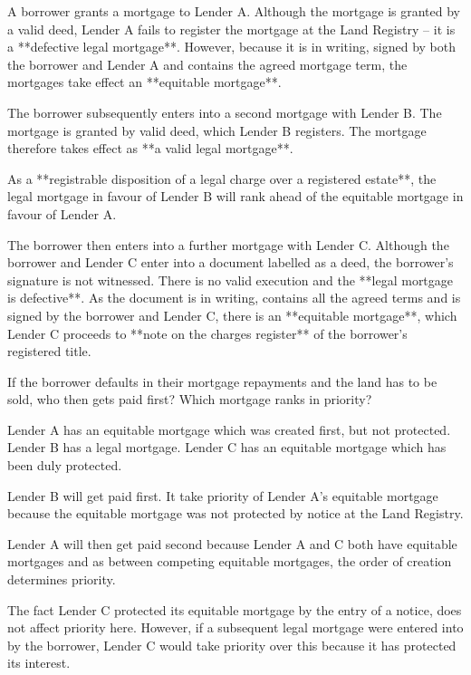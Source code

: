 \documentclass[
]{article}
\newenvironment{Shaded}{}{}
\newcommand{\NormalTok}[1]{#1}
\begin{document}
\begin{Shaded}
\begin{Highlighting}[]
\NormalTok{A borrower grants a mortgage to Lender A. Although the mortgage is granted by a valid deed, Lender A fails to register the mortgage at the Land Registry – it is a **defective legal mortgage**. However, because it is in writing, signed by both the borrower and Lender A and contains the agreed mortgage term, the mortgages take effect an **equitable mortgage**.}

\NormalTok{The borrower subsequently enters into a second mortgage with Lender B. The mortgage is granted by valid deed, which Lender B registers. The mortgage therefore takes effect as **a valid legal mortgage**.}

\NormalTok{As a **registrable disposition of a legal charge over a registered estate**, the legal mortgage in favour of Lender B will rank ahead of the equitable mortgage in favour of Lender A.}

\NormalTok{The borrower then enters into a further mortgage with Lender C. Although the borrower and Lender C enter into a document labelled as a deed, the borrower’s signature is not witnessed. There is no valid execution and the **legal mortgage is defective**. As the document is in writing, contains all the agreed terms and is signed by the borrower and Lender C, there is an **equitable mortgage**, which Lender C proceeds to **note on the charges register** of the borrower’s registered title.}

\NormalTok{If the borrower defaults in their mortgage repayments and the land has to be sold, who then gets paid first? Which mortgage ranks in priority?}

\NormalTok{Lender A has an equitable mortgage which was created first, but not protected. Lender B has a legal mortgage. Lender C has an equitable mortgage which has been duly protected.}

\NormalTok{Lender B will get paid first. It take priority of Lender A’s equitable mortgage because the equitable mortgage was not protected by notice at the Land Registry.}

\NormalTok{Lender A will then get paid second because Lender A and C both have equitable mortgages and as between competing equitable mortgages, the order of creation determines priority.}

\NormalTok{The fact Lender C protected its equitable mortgage by the entry of a notice, does not affect priority here. However, if a subsequent legal mortgage were entered into by the borrower, Lender C would take priority over this because it has protected its interest.}
\end{Highlighting}
\end{Shaded}
\end{document}
